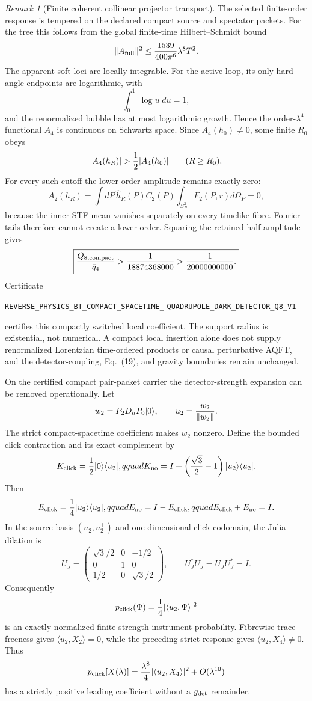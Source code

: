 \documentclass[11pt]{article}
\theoremstyle{definition}
\theoremstyle{remark}
\newtheorem{remark}[theorem]{Remark}
\begin{document}
\begin{remark}[Finite coherent collinear projector transport]
The selected finite-order response is tempered on the declared compact
source and spectator packets.  For the tree this follows from the global
finite-time Hilbert--Schmidt bound
\[
 \|A_{\rm full}\|^2
 \leq {1539\over400\pi^6}\lambda^8T^2.
\]
The apparent soft loci are locally integrable.  For the active loop, its only
hard-angle endpoints are logarithmic, with
\[
 \int_0^1|\log u|du=1,
\]
and the renormalized bubble has at most logarithmic growth.  Hence the
order-$\lambda^4$ functional $A_4$ is continuous on Schwartz space.  Since
$A_4(h_0)\ne0$, some finite $R_0$ obeys
\[
 |A_4(h_R)|>{1\over2}|A_4(h_0)|\qquad(R\geq R_0).
\]
For every such cutoff the lower-order amplitude remains exactly zero:
\[
 A_2(h_R)=\int dP\,\widehat h_R(P)C_2(P)
 \int_{S_P^2}F_2(P,r)d\Omega_P=0,
\]
because the inner STF mean vanishes separately on every timelike fibre.
Fourier tails therefore cannot create a lower order.  Squaring the retained
half-amplitude gives
\[
 \boxed{{Q_{8,\mathrm{compact}}\over\bar q_4}
 >{1\over18874368000}>{1\over20000000000}.}
\]
Certificate
\par\noindent
\texttt{REVERSE\_PHYSICS\_BT\_COMPACT\_SPACETIME\_}
\allowbreak\texttt{QUADRUPOLE\_DARK\_DETECTOR\_Q8\_V1}
\par\noindent
certifies this compactly switched local coefficient.  The support radius is
existential, not numerical.  A compact local insertion alone does not supply
renormalized Lorentzian time-ordered products or causal perturbative AQFT,
and the detector-coupling, Eq.~(19), and gravity boundaries remain unchanged.

On the certified compact pair-packet carrier the detector-strength expansion
can be removed operationally.  Let
\[
 w_2=P_2D_hP_0|0\rangle,\qquad u_2={w_2\over\|w_2\|}.
\]
The strict compact-spacetime coefficient makes $w_2$ nonzero.  Define the
bounded click contraction and its exact complement by
\[
 K_{\rm click}={1\over2}|0\rangle\langle u_2|,qquad
 K_{\rm no}=I+\left({\sqrt3\over2}-1\right)|u_2\rangle\langle u_2|.
\]
Then
\[
 E_{\rm click}={1\over4}|u_2\rangle\langle u_2|,qquad
 E_{\rm no}=I-E_{\rm click},qquad
 E_{\rm click}+E_{\rm no}=I.
\]
In the source basis $(u_2,u_2^\perp)$ and one-dimensional click codomain, the
Julia dilation is
\[
 U_J=
 \begin{pmatrix}
 \sqrt3/2&0&-1/2\\
 0&1&0\\
 1/2&0&\sqrt3/2
 \end{pmatrix},
 \qquad U_J^*U_J=U_JU_J^*=I.
\]
Consequently
\[
 p_{\rm click}(\Psi)={1\over4}|\langle u_2,\Psi\rangle|^2
\]
is an exactly normalized finite-strength instrument probability.  Fibrewise
trace-freeness gives $\langle u_2,X_2\rangle=0$, while the preceding strict
response gives $\langle u_2,X_4\rangle\ne0$.  Thus
\[
 p_{\rm click}[X(\lambda)]
 ={\lambda^8\over4}|\langle u_2,X_4\rangle|^2+O(\lambda^{10})
\]
has a strictly positive leading coefficient without a $g_{\rm det}$
remainder.


\end{remark}
\end{document}
